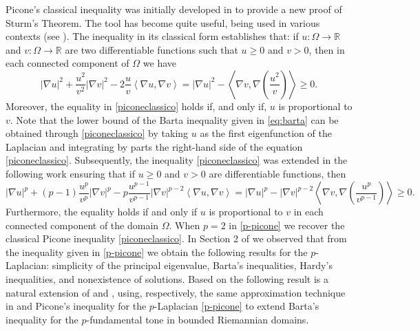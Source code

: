 \documentclass{article}
\begin{document}
Picone's classical inequality was initially developed in \cite[p. 18]{Picone1909} to provide a new proof of Sturm's Theorem. The tool has become quite useful, being used in various contexts (see \cite{AllegrettoHuang1998, AroraGiacomoniWarnault2020, Jaros2015, lindqvist, Tadie2009}). The inequality in its classical form establishes that: if $u: \Omega \to \mathbb{R}$ and $v: \Omega \to \mathbb{R}$ are two differentiable functions such that $u \geq 0$ and $v > 0$, then in each connected component of $\Omega$ we have
\begin{equation}\label{piconeclassico}
| \nabla u |^2 + \dfrac{u^2}{v^2} | \nabla v |^2 - 2 \dfrac{u}{v} \left\langle \nabla u, \nabla v \right\rangle = | \nabla u |^2 - \left\langle \nabla v, \nabla \left( \dfrac{u^2}{v} \right) \right\rangle \geq 0.
\end{equation}
Moreover, the equality in \eqref{piconeclassico} holds if, and only if, $u$ is proportional to $v$. Note that the lower bound of the Barta inequality given in \eqref{eq:barta} can be obtained through \eqref{piconeclassico} by taking $u$ as the first eigenfunction of the Laplacian and integrating by parts the right-hand side of the equation \eqref{piconeclassico}. Subsequently, the inequality \eqref{piconeclassico} was extended in the following work \cite[Theorem 1.1]{AllegrettoHuang1998} ensuring that if $u \geq 0$ and $v > 0$ are differentiable functions, then
\begin{equation}\label{p-picone}
| \nabla u |^p + (p-1)\dfrac{u^p}{v^p} | \nabla v |^p - p \dfrac{u^{p-1}}{v^{p-1}} | \nabla v |^{p-2} \left\langle \nabla u, \nabla v \right\rangle = | \nabla u |^p - | \nabla v |^{p-2} \left\langle \nabla v, \nabla \left( \dfrac{u^p}{v^{p-1}} \right) \right\rangle \geq 0.
\end{equation}
Furthermore, the equality holds if and only if $u$ is proportional to $v$ in each connected component of the domain $\Omega$. When $p=2$ in \eqref{p-picone} we recover the classical Picone inequality \eqref{piconeclassico}. In Section 2 of \cite{AllegrettoHuang1998} we observed that from the inequality given in \eqref{p-picone} we obtain the following results for the $p$-Laplacian: simplicity of the principal eigenvalue, Barta's inequalities, Hardy's inequalities, and nonexistence of solutions. Based on \cite[Lemma 2.1]{AllegrettoHuang1998} the following result is a natural extension of \cite[Proposition 2.1]{BessaMontenegro} and \cite[Corollary 2.1]{AllegrettoHuang1998}, using, respectively, the same approximation technique in \cite{BessaMontenegro} and Picone's inequality for the $p$-Laplacian \eqref{p-picone} to extend Barta's inequality for the $p$-fundamental tone in bounded Riemannian domains.
\end{document}
